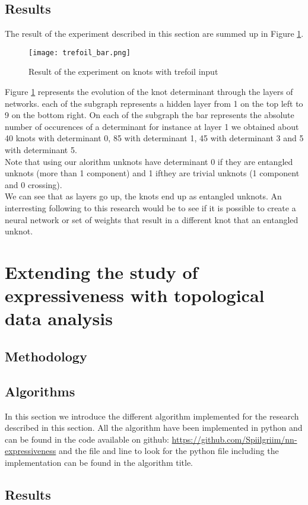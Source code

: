 \documentclass[12pt, a4paper]{article}
\begin{document}
\subsection{Results}

The result of the experiment described in this section are summed up in Figure \ref{fig:knot_results}.

\begin{figure}[H]
  \centering
  \texttt{[image: trefoil\_bar.png]}
  \caption{Result of the experiment on knots with trefoil input}
  \label{fig:knot_results}
\end{figure}

Figure \ref{fig:knot_results} represents the evolution of the knot determinant through the layers of networks. each of the subgraph represents a hidden layer from 1 on the top left to 9 on the bottom right. On each of the subgraph the bar represents the absolute number of occurences of a determinant for instance at layer 1 we obtained about 40 knots with determinant 0, 85 with determinant 1, 45 with determinant 3 and 5 with determinant 5.\\

Note that using our alorithm unknots have determinant 0 if they are entangled unknots (more than 1 component) and 1 ifthey are trivial unknots (1 component and 0 crossing).\\

We can see that as layers go up, the knots end up as entangled unknots. An interresting following to this research would be to see if it is possible to create a neural network or set of weights that result in a different knot that an entangled unknot. 

\newpage
\thispagestyle{empty}
\mbox{}
\newpage

\section{Extending the study of expressiveness with topological data analysis} 
\subsection{Methodology}

\subsection{Algorithms}

In this section we introduce the different algorithm implemented for the research described in this section. All the algorithm have been implemented in python and can be found in the code available on github: \url{https://github.com/Spiilgriim/nn-expressiveness} and the file and line to look for the python file including the implementation can be found in the algorithm title.

\subsection{Results}

\newpage
\thispagestyle{empty}
\mbox{}
\newpage




\end{document}
